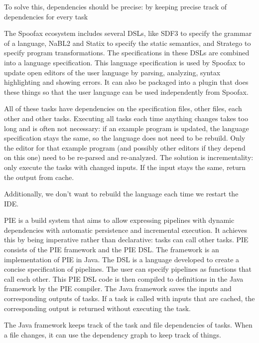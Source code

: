 To solve this, dependencies should be precise: by keeping precise track of dependencies for every task





The Spoofax ecosystem includes several DSLs, like SDF3 to specify the grammar of a language, NaBL2 and Statix to specify the static semantics, and Stratego to specify program transformations. 
The specifications in these DSLs are combined into a language specification.
This language specification is used by Spoofax to update open editors of the user language by parsing, analyzing, syntax highlighting and showing errors.
It can also be packaged into a plugin that does these things so that the user language can be used independently from Spoofax.

All of these tasks have dependencies on the specification files, other files, each other and other tasks.
Executing all tasks each time anything changes takes too long and is often not necessary: if an example program is updated, the language specification stays the same, so the language does not need to be rebuild.
Only the editor for that example program (and possibly other editors if they depend on this one) need to be re-parsed and re-analyzed.
The solution is incrementality: only execute the tasks with changed inputs.
If the input stays the same, return the output from cache.

Additionally, we don't want to rebuild the language each time we restart the IDE.


\Ac{PIE} is a build system that aims to allow expressing pipelines with dynamic dependencies with automatic persistence and incremental execution.
It achieves this by being imperative rather than declarative: tasks can call other tasks.
\Ac{PIE} consists of the PIE framework and the \ac{PIE} \ac{DSL}.
The framework is an implementation of \ac{PIE} in Java.
The \ac{DSL} is a language developed to create a concise specification of pipelines.
The user can specify pipelines as functions that call each other.
This \ac{PIE} \ac{DSL} code is then compiled to definitions in the Java framework by the \ac{PIE} compiler.
The Java framework saves the inputs and corresponding outputs of tasks.
If a task is called with inputs that are cached, the corresponding output is returned without executing the task.

The Java framework keeps track of the task and file dependencies of tasks.
When a file changes, it can use the dependency graph to keep track of things.


